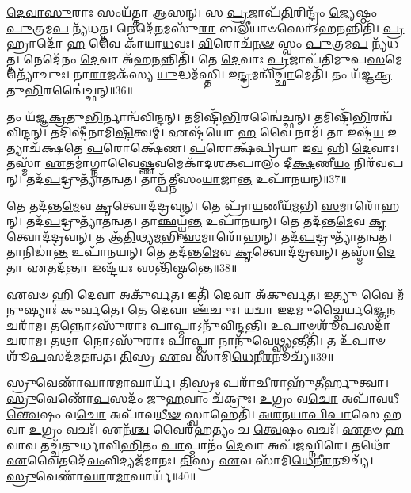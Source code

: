 \-\ul{𑌦𑍇}\-\-\ul{𑌵𑌾}\-\-\ul{𑌸𑍁}\-𑌰𑌾𑌃 𑌸𑌂𑌯᳴𑌤𑍍𑌤𑌾 𑌆𑌸𑌨𑍍।
𑌸 \ul{𑌪𑍍𑌰}\-𑌜𑌾𑌪᳴\-\ul{𑌤𑌿}\-𑌰𑌿𑌨𑍍𑌦𑍍𑌰𑌂᳴ \ul{𑌜𑍍𑌯𑍇}\-𑌷𑍍𑌠𑌂 \ul{𑌪𑍁}\-𑌤𑍍𑌰𑌮\-\ul{𑌪} 𑌨𑍍𑌯᳴𑌧𑌤𑍍𑌤।
𑌨𑍇𑌦𑍇᳴\-\ul{𑌨}\-𑌮𑌸𑍁᳴\-\ul{𑌰𑌾} 𑌬𑌲𑍀᳴𑌯𑌾𑍞𑌸𑍋\-𑌽𑌹\-\ul{𑌨}\-𑌨𑍍𑌨𑌿𑌤𑌿᳴।
\-\ul{𑌪𑍍𑌰}\-𑌹𑍍𑌰𑌾𑌦𑍋᳴ \ul{𑌹} 𑌵𑍈 𑌕𑌾᳴𑌯𑌾\-\ul{𑌧}\-𑌵𑌃।
\-\ul{𑌵𑌿}\-𑌰𑍋𑌚᳴\-\ul{𑌨}\-\-\ul{𑍟} 𑌸𑍍𑌵𑌂 \ul{𑌪𑍁}\-𑌤𑍍𑌰𑌮\-\ul{𑌪} 𑌨𑍍𑌯᳴𑌧𑌤𑍍𑌤।
𑌨𑍇𑌦𑍇᳴𑌨𑌂 \ul{𑌦𑍇}\-𑌵𑌾 𑌅᳴𑌹\-\ul{𑌨}\-𑌨𑍍𑌨𑌿𑌤𑌿᳴।
𑌤𑍇 \ul{𑌦𑍇}\-𑌵𑌾𑌃 \ul{𑌪𑍍𑌰}\-𑌜𑌾𑌪᳴𑌤𑌿𑌮𑍁𑌪\-\ul{𑌸}\-𑌮𑍇𑌤𑍍𑌯𑍋᳴𑌚𑍁𑌃।
𑌨𑌾\-\ul{𑌰𑌾}\-𑌜𑌕᳴𑌸𑍍𑌯 \ul{𑌯𑍁}\-𑌦𑍍𑌧𑌮᳴𑌸𑍍𑌤𑌿।
𑌇\-\ul{𑌨𑍍𑌦𑍍𑌰}\-𑌮𑌨𑍍𑌵𑌿᳴\-\ul{𑌚𑍍𑌛𑌾}\-𑌮𑍇𑌤𑌿᳴।
𑌤𑌂 𑌯᳴𑌜𑍍𑌞\-\ul{𑌕𑍍𑌰}\-𑌤𑍁\-\ul{𑌭𑌿}\-𑌰𑌨𑍍𑌵𑍈॑𑌚𑍍𑌛𑌨𑍍॥36॥

𑌤𑌂 𑌯᳴𑌜𑍍𑌞\-\ul{𑌕𑍍𑌰}\-𑌤𑍁\-\ul{𑌭𑌿}\-𑌰𑍍𑌨𑌾𑌨𑍍𑌵᳴𑌵𑌿𑌨𑍍𑌦𑌨𑍍।
𑌤𑌮𑌿𑌷𑍍𑌟𑌿᳴\-\ul{𑌭𑌿}\-𑌰𑌨𑍍𑌵𑍈॑𑌚𑍍𑌛𑌨𑍍।
𑌤𑌮𑌿𑌷𑍍𑌟𑌿᳴\-\ul{𑌭𑌿}\-𑌰𑌨𑍍𑌵᳴\-𑌵𑌿𑌨𑍍𑌦𑌨𑍍।
𑌤𑌦𑌿𑌷𑍍𑌟𑍀᳴𑌨𑌾𑌮𑌿\-\ul{𑌷𑍍𑌟𑌿}\-\-𑌤𑍍𑌵𑌮𑍍।
𑌏𑌷𑍍𑌟᳴𑌯𑍋 \ul{𑌹} 𑌵𑍈 𑌨𑌾𑌮᳴।
𑌤𑌾 𑌇𑌷𑍍𑌟᳴\-\ul{𑌯} 𑌇𑌤𑍍𑌯𑌾𑌚᳴𑌕𑍍𑌷𑌤𑍇 \ul{𑌪}\-𑌰𑍋𑌕𑍍𑌷𑍇᳴𑌣।
\-\ul{𑌪}\-𑌰𑍋𑌕𑍍𑌷᳴𑌪𑍍𑌰𑌿𑌯𑌾 𑌇\-\ul{𑌵} 𑌹𑌿 \ul{𑌦𑍇}\-𑌵𑌾𑌃।
𑌤𑌸𑍍𑌮𑌾᳴ \ul{𑌏}\-𑌤𑌮𑌾॑𑌗𑍍𑌨𑌾𑌵𑍈\-\ul{𑌷𑍍𑌣}\-𑌵𑌮𑍇𑌕𑌾᳴\-𑌦𑌶\-𑌕𑌪𑌾𑌲𑌂 𑌦𑍀\-\ul{𑌕𑍍𑌷}\-𑌣𑍀\-\ul{𑌯𑌂} 𑌨𑌿𑌰᳴𑌵𑌪𑌨𑍍।
𑌤𑌦᳴\-\ul{𑌪}\-𑌦𑍍𑌰𑍁𑌤𑍍𑌯𑌾᳴𑌤𑌨𑍍𑌵𑌤।
𑌤𑌾𑌨𑍍𑌪᳴𑌤𑍍𑌨𑍀𑌸𑌂\-\ul{𑌯𑌾}\-𑌜𑌾\-\ul{𑌨𑍍𑌤} 𑌉𑌪𑌾᳴𑌨𑌯𑌨𑍍॥37॥

𑌤𑍇 𑌤𑌦᳴𑌨𑍍𑌤\-\ul{𑌮𑍇}\-𑌵 \ul{𑌕𑍃}\-𑌤𑍍𑌵𑍋𑌦᳴𑌦𑍍𑌰𑌵𑌨𑍍।
𑌤𑍇 𑌪𑍍𑌰𑌾᳴\-\ul{𑌯}\-𑌣𑍀𑌯᳴\-\ul{𑌮}\-𑌭𑌿 \ul{𑌸}\-𑌮𑌾𑌰𑍋᳴𑌹𑌨𑍍।
𑌤𑌦᳴\-\ul{𑌪}\-𑌦𑍍𑌰𑍁𑌤𑍍𑌯𑌾᳴\-𑌤𑌨𑍍𑌵𑌤।
𑌤𑌾\-\ul{𑌞𑍍𑌛}\-𑌯𑍍𑌯𑍍𑌵𑌁᳴\-\ul{𑌨𑍍𑌤} 𑌉𑌪𑌾᳴𑌨𑌯𑌨𑍍।
𑌤𑍇 𑌤𑌦᳴𑌨𑍍𑌤\-\ul{𑌮𑍇}\-𑌵 \ul{𑌕𑍃}\-𑌤𑍍𑌵𑍋𑌦᳴𑌦𑍍𑌰𑌵𑌨𑍍।
𑌤 𑌆᳴\-\ul{𑌤𑌿}\-𑌥𑍍𑌯\-\ul{𑌮}\-𑌭𑌿 \ul{𑌸}\-𑌮𑌾𑌰𑍋᳴𑌹𑌨𑍍।
𑌤𑌦᳴\-\ul{𑌪}\-𑌦𑍍𑌰𑍁𑌤𑍍𑌯𑌾᳴\-𑌤𑌨𑍍𑌵𑌤।
𑌤𑌾𑌨𑌿𑌡𑌾॑\-\ul{𑌨𑍍𑌤} 𑌉𑌪𑌾᳴𑌨𑌯𑌨𑍍।
𑌤𑍇 𑌤𑌦᳴𑌨𑍍𑌤\-\ul{𑌮𑍇}\-𑌵 \ul{𑌕𑍃}\-𑌤𑍍𑌵𑍋𑌦᳴𑌦𑍍𑌰𑌵𑌨𑍍।
𑌤𑌸𑍍𑌮𑌾᳴\-\ul{𑌦𑍇}\-𑌤𑌾 \ul{𑌏}\-𑌤𑌦᳴\-\ul{𑌨𑍍𑌤𑌾} 𑌇𑌷𑍍𑌟᳴\-\ul{𑌯𑌃} 𑌸𑌨𑍍𑌤𑌿᳴𑌷𑍍𑌠𑌨𑍍𑌤𑍇॥38॥

\-\ul{𑌏}\-𑌵𑍞 𑌹𑌿 \ul{𑌦𑍇}\-𑌵𑌾 𑌅𑌕𑍁᳴𑌰𑍍𑌵𑌤।
𑌇𑌤𑌿᳴ \ul{𑌦𑍇}\-𑌵𑌾 𑌅᳴𑌕𑍁𑌰𑍍𑌵𑌤।
𑌇\-\ul{𑌤𑍍𑌯𑍁} 𑌵𑍈 𑌮᳴\-\ul{𑌨𑍁}\-𑌷𑍍𑌯𑌾𑌃॑ 𑌕𑍁𑌰𑍍𑌵𑌤𑍇।
𑌤𑍇 \ul{𑌦𑍇}\-𑌵𑌾 𑌊᳴𑌚𑍁𑌃।
𑌯𑌦𑍍𑌵𑌾 \ul{𑌇}\-𑌦\-\ul{𑌮𑍁}\-𑌚𑍍𑌚𑍈\-\ul{𑌰𑍍𑌯}\-𑌜𑍍𑌞𑍇\-\ul{𑌨} 𑌚𑌰𑌾᳴𑌮।
𑌤𑌨𑍍𑌨𑍋\-𑌽𑌸𑍁᳴𑌰𑌾𑌃 \ul{𑌪𑌾}\-𑌪𑍍𑌮𑌾\-𑌽𑌨𑍁᳴𑌵𑌿𑌨𑍍𑌦𑌨𑍍𑌤𑌿।
\-\ul{𑌉}\-\-\ul{𑌪𑌾}\-\-\ul{𑍞}\-𑌶𑍂᳴\-\ul{𑌪}\-𑌸𑌦𑌾᳴ 𑌚𑌰𑌾𑌮।
𑌤\-\ul{𑌥𑌾} 𑌨𑍋𑌽𑌸𑍁᳴𑌰𑌾𑌃 \ul{𑌪𑌾}\-𑌪𑍍𑌮𑌾 𑌨𑌾𑌨𑍁᳴𑌵𑍇\-\ul{𑌥𑍍𑌸𑍍𑌯}\-𑌨𑍍𑌤𑍀𑌤𑌿᳴।
𑌤 𑌉᳴\-\ul{𑌪𑌾}\-\-\ul{𑍞}\-𑌶𑍂᳴\-\ul{𑌪}\-𑌸𑌦᳴𑌮𑌤𑌨𑍍𑌵𑌤।
\-\ul{𑌤𑌿}\-𑌸𑍍𑌰 \ul{𑌏}\-𑌵 𑌸𑌾᳴𑌮𑌿\-\ul{𑌧𑍇}\-𑌨𑍀\-\ul{𑌰}\-𑌨𑍂𑌚𑍍𑌯᳴॥39॥

\-\ul{𑌸𑍍𑌰𑍁}\-𑌵𑍇𑌣𑌾᳴\-\ul{𑌘𑌾}\-𑌰\-\ul{𑌮𑌾}\-𑌘𑌾𑌰𑍍𑌯᳴।
\-\ul{𑌤𑌿}\-𑌸𑍍𑌰𑌃 𑌪𑌰𑌾᳴\-\ul{𑌚𑍀}\-𑌰𑌾𑌹𑍁᳴𑌤𑍀𑌰𑍍\mbox{}\-\ul{𑌹𑍁}\-𑌤𑍍𑌵𑌾।
\-\ul{𑌸𑍍𑌰𑍁}\-𑌵𑍇𑌣𑍋᳴\-\ul{𑌪}\-𑌸𑌦𑌂᳴ 𑌜𑍁\-\ul{𑌹}\-𑌵𑌾𑌂 𑌚᳴𑌕𑍍𑌰𑍁𑌃।
\-\ul{𑌉}\-𑌗𑍍𑌰𑌂 𑌵\-\ul{𑌚𑍋} 𑌅𑌪𑌾᳴𑌵𑌧𑍀\-\ul{𑌨𑍍𑌤𑍍𑌵𑍇}\-𑌷𑌂 𑌵\-\ul{𑌚𑍋} 𑌅𑌪𑌾᳴𑌵\-\ul{𑌧𑍀}\-\-\ul{𑍟} 𑌸𑍍𑌵𑌾𑌹𑍇𑌤𑌿᳴।
\-\ul{𑌅}\-\-\ul{𑌶}\-\-\ul{𑌨}\-\-\ul{𑌯𑌾}\-\-\ul{𑌪𑌿}\-\-\ul{𑌪𑌾}\-𑌸𑍇 \ul{𑌹} 𑌵𑌾 \ul{𑌉}\-𑌗𑍍𑌰𑌂 𑌵𑌚𑌃᳴।
𑌏𑌨᳴\-\ul{𑌶𑍍𑌚} 𑌵𑍈𑌰᳴𑌹𑌤𑍍𑌯𑌂 𑌚 \ul{𑌤𑍍𑌵𑍇}\-𑌷𑌂 𑌵𑌚𑌃᳴।
\-\ul{𑌏}\-𑌤𑍞 \ul{𑌹} 𑌵𑌾𑌵 𑌤𑌚𑍍𑌚᳴𑌤𑍁𑌰𑍍𑌧𑌾𑌵𑌿\-\ul{𑌹𑌿}\-𑌤𑌂 \ul{𑌪𑌾}\-𑌪𑍍𑌮𑌾𑌨𑌂᳴ \ul{𑌦𑍇}\-𑌵𑌾 𑌅𑌪᳴𑌜𑌘𑍍𑌨𑌿𑌰𑍇।
𑌤𑌥𑍋᳴ \ul{𑌏}\-𑌵𑍈𑌤𑌦𑍇᳴\-\ul{𑌵𑌂}\-𑌵𑌿𑌦𑍍𑌯𑌜᳴𑌮𑌾𑌨𑌃।
\-\ul{𑌤𑌿}\-𑌸𑍍𑌰 \ul{𑌏}\-𑌵 𑌸𑌾᳴𑌮𑌿\-\ul{𑌧𑍇}\-𑌨𑍀\-\ul{𑌰}\-𑌨𑍂𑌚𑍍𑌯᳴।
\-\ul{𑌸𑍍𑌰𑍁}\-𑌵𑍇𑌣𑌾᳴\-\ul{𑌘𑌾}\-𑌰\-\ul{𑌮𑌾}\-𑌘𑌾𑌰𑍍𑌯᳴॥40॥

